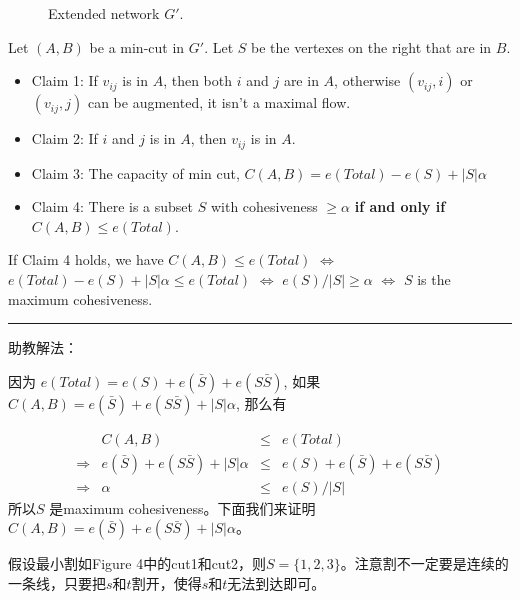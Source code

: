 \documentclass[a4paper,12pt]{article}
\begin{document}
\begin{figure}[!ht]
\begin{minipage}[b]{.5\textwidth}
\caption{Extended network $G'$.}
\end{minipage}
\end{figure}

Let $(A,B)$ be a min-cut in $G'$. Let $S$ be the vertexes on the right that are in $B$.

\begin{itemize}
  \item Claim 1: If $v_{ij}$ is in $A$, then both $i$ and $j$ are in $A$, otherwise $(v_{ij},i)$ or $(v_{ij},j)$ can be augmented, it isn't a maximal flow.
  \item Claim 2: If $i$ and $j$ is in $A$, then $v_{ij}$ is in $A$.
  \item Claim 3: The capacity of min cut, $C(A,B)=e(Total)-e(S)+|S|\alpha$
  \item Claim 4: There is a subset $S$ with cohesiveness $\geq \alpha$ \textbf{if and only if $C(A,B)\leq e(Total)$}.
\end{itemize}

If Claim 4 holds, we have $C(A,B)\leq e(Total)$ $\Leftrightarrow$ $e(Total)-e(S)+|S|\alpha\leq e(Total)$ $\Leftrightarrow$ $e(S)/|S|\geq\alpha$ $\Leftrightarrow$ $S$ is the maximum cohesiveness.

\rule{\textwidth}{1pt}

助教解法：

因为 $e(Total)=e(S)+e(\bar S)+e(S\bar S)$, 如果 $C(A,B)=e(\bar S)+e(S\bar S)+|S|\alpha$, 那么有

\[
\begin{array}{rrcll}
& C(A,B)& \leq & e(Total) \\
\Rightarrow & e(\bar S)+e(S\bar S)+|S|\alpha & \leq & e(S)+e(\bar S)+e(S\bar S)\\
\Rightarrow & \alpha & \leq & e(S)/|S|
\end{array} \nonumber
\]
所以$S$ 是maximum cohesiveness。下面我们来证明$C(A,B)=e(\bar S)+e(S\bar S)+|S|\alpha$。

假设最小割如Figure 4中的cut1和cut2，则$S=\{1,2,3\}$。\textcolor[rgb]{1.00,0.00,0.00}{注意割不一定要是连续的一条线，只要把$s$和$t$割开，使得$s$和$t$无法到达即可。}
\end{document}
